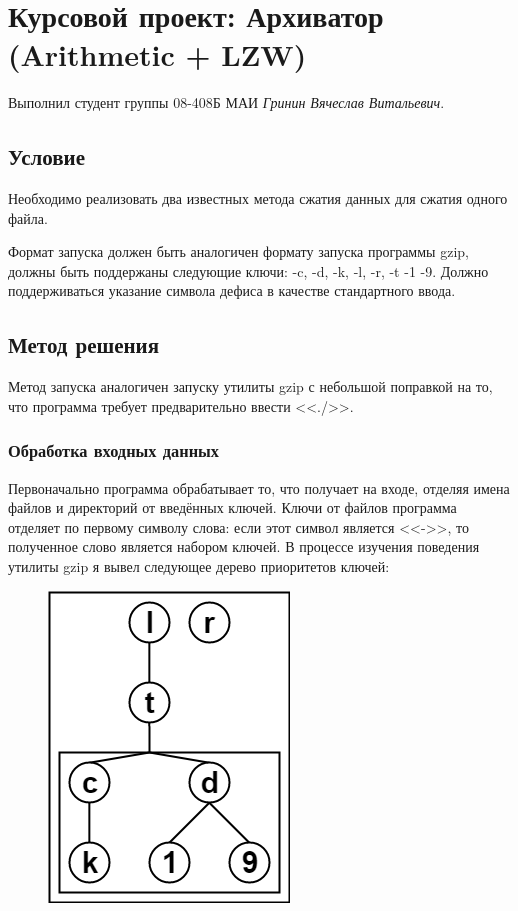 \documentclass[12pt]{article}
\begin{document}
\section*{Курсовой проект: Архиватор (Arithmetic + LZW)}
\noindent
Выполнил студент группы 08-408Б МАИ \textit{Гринин Вячеслав Витальевич}.

\subsection*{Условие}

Необходимо реализовать два известных метода сжатия данных для сжатия одного файла. 

Формат запуска должен быть аналогичен формату запуска программы gzip, должны быть поддержаны следующие ключи: -c, -d, -k, -l, -r, -t -1 -9. Должно поддерживаться указание символа дефиса в качестве стандартного ввода.

\subsection*{Метод решения}

Метод запуска аналогичен запуску утилиты gzip с небольшой поправкой на то, что программа требует предварительно ввести <<./>>.

\subsubsection*{Обработка входных данных}

Первоначально программа обрабатывает то, что получает на входе, отделяя имена файлов и директорий от введённых ключей. Ключи от файлов программа отделяет по первому символу слова: если этот символ является <<->>, то полученное слово является набором ключей. В процессе изучения поведения утилиты gzip я вывел следующее дерево приоритетов ключей:

\begin{figure}[h!]
	\centering\includegraphics[scale=0.5]{KeyTree}
\end{figure}
\end{document}
